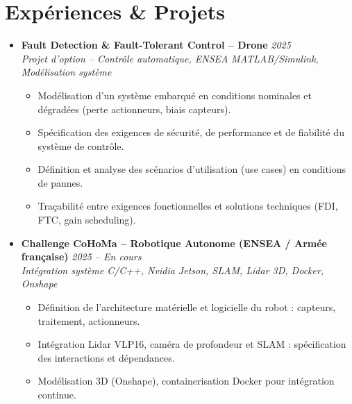 \documentclass[a4paper,11pt]{article}
\begin{document}
\section{Expériences \& Projets}
\begin{itemize}[leftmargin=*, label={-}]

\item \textbf{Fault Detection \& Fault-Tolerant Control -- Drone} \hfill \textit{2025} \\
\textit{Projet d'option -- Contrôle automatique, ENSEA} \hfill \textit{MATLAB/Simulink, Modélisation système}
\vspace{-2pt}
    \begin{itemize}[leftmargin=0.4cm, nosep, label=\tiny$\bullet$]
        \item \small{Modélisation d'un système embarqué en conditions nominales et dégradées (perte actionneurs, biais capteurs).}
        \item \small{Spécification des exigences de sécurité, de performance et de fiabilité du système de contrôle.}
        \item \small{Définition et analyse des scénarios d'utilisation (use cases) en conditions de pannes.}
        \item \small{Traçabilité entre exigences fonctionnelles et solutions techniques (FDI, FTC, gain scheduling).}
    \end{itemize}
\vspace{3pt}

\item \textbf{Challenge CoHoMa -- Robotique Autonome (ENSEA / Armée française)} \hfill \textit{2025 -- En cours} \\
\textit{Intégration système} \hfill \textit{C/C++, Nvidia Jetson, SLAM, Lidar 3D, Docker, Onshape}
\vspace{-2pt}
    \begin{itemize}[leftmargin=0.4cm, nosep, label=\tiny$\bullet$]
        \item \small{Définition de l'architecture matérielle et logicielle du robot : capteurs, traitement, actionneurs.}
        \item \small{Intégration Lidar VLP16, caméra de profondeur et SLAM : spécification des interactions et dépendances.}
        \item \small{Modélisation 3D (Onshape), containerisation Docker pour intégration continue.}
    \end{itemize}
\vspace{3pt}


\end{itemize}
\end{document}
